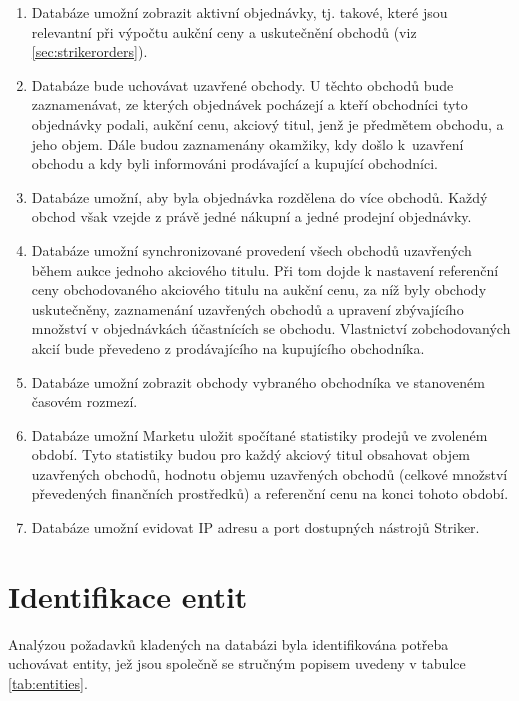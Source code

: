 \documentclass[thesis=M,czech]{FITthesis}[2012/06/26]
\begin{document}
\begin{enumerate}
	\item Databáze umožní zobrazit aktivní objednávky, tj. takové, které jsou relevantní při výpočtu aukční ceny a uskutečnění
		obchodů (viz \ref{sec:strikerorders}). 
	\item Databáze bude uchovávat uzavřené obchody. U těchto obchodů
		bude zaznamenávat, ze kterých objednávek pocházejí a kteří obchodníci tyto objednávky podali, aukční cenu, akciový 
		titul, jenž je předmětem obchodu, a jeho objem. Dále budou zaznamenány okamžiky, kdy došlo k~uzavření obchodu
		a kdy byli informováni prodávající a kupující obchodníci.
	\item Databáze umožní, aby byla objednávka rozdělena do více obchodů. Každý obchod však vzejde z právě jedné 
		nákupní a jedné prodejní objednávky.
	\item Databáze umožní synchronizované provedení všech obchodů uzavřených během aukce jednoho akciového titulu. 
		Při tom dojde k nastavení referenční ceny obchodovaného akciového titulu na aukční cenu, za níž byly obchody uskutečněny, 
		zaznamenání uzavřených obchodů a upravení zbývajícího množství v objednávkách účastnících se obchodu. Vlastnictví 
		zobchodovaných akcií bude převedeno z prodávajícího na kupujícího obchodníka.
	\item Databáze umožní zobrazit obchody vybraného obchodníka ve stanoveném časovém rozmezí.
	\item Databáze umožní Marketu uložit spočítané statistiky prodejů ve zvoleném období. Tyto statistiky budou pro každý akciový 
		titul obsahovat objem uzavřených obchodů, hodnotu objemu uzavřených obchodů (celkové množství převedených finančních 
		prostředků) a referenční cenu na konci tohoto období.
	\item Databáze umožní evidovat IP adresu a port dostupných nástrojů Striker.
\end{enumerate}


\section{Identifikace entit}

Analýzou požadavků kladených na databázi byla identifikována potřeba uchovávat entity, jež jsou společně se stručným popisem 
uvedeny v tabulce \ref{tab:entities}.
\end{document}
